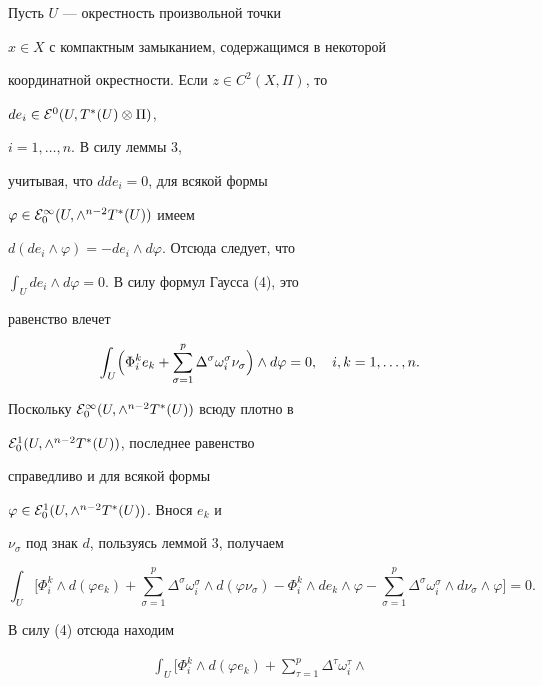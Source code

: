 \begin{pf} Пусть $U$ --- окрестность произвольной точки


$x\in X$ с компактным замыканием, содержащимся в некоторой


координатной окрестности. Если $z\in C^2(X,\Pi)$, то


$de_i\in {\cal E}^0(U,T^*(U)\otimes \Pi)$,


$i= 1,\dotsc,n$. В силу леммы 3,


учитывая, что $dde_i= 0$, для всякой формы


$\varphi\in {\cal E}^{\infty}_0(U,\wedge^{n-2}T^*(U))$ имеем


$d(de_i\wedge \varphi)= -de_i\wedge d\varphi$. Отсюда следует, что


$\int_U de_i\wedge d\varphi= 0$. В силу формул Гаусса (4), это


равенство влечет


$$


\int_{U}\Bigl(\Phi^k_ie_k+\sum_{\sigma=1}^{p}\Delta^{\sigma}\omega^{\sigma}_i


\nu_{\sigma}\Bigr)\wedge d\varphi=0,\quad i,k=1,\dotsc,n.


$$


Поскольку ${\cal E}^{\infty}_0(U,\wedge^{n-2}T^*(U))$ всюду плотно в


${\cal E}^1_0(U,\wedge^{n-2}T^*(U))$, последнее равенство


справедливо и для всякой формы


$\varphi\in {\cal E}^1_0(U,\wedge^{n-2}T^*(U))$. Внося $e_k$ и


$\nu_{\sigma}$ под знак $d$, пользуясь леммой 3, получаем


$$


\int_{U}\biggl[\Phi^k_i\wedge d(\varphi e_k)+


\sum_{\sigma=1}^{p}\Delta^{\sigma}\omega^{\sigma}_i\wedge


d(\varphi\nu_{\sigma})-\Phi^k_i\wedge de_k\wedge\varphi-


\sum_{\sigma=1}^{p}\Delta^{\sigma}\omega^{\sigma}_i\wedge


d\nu_{\sigma}\wedge\varphi\biggr]=0.


$$


В силу (4) отсюда находим


\begin{gather*}


\int_{U}\biggl[\Phi^k_i\wedge d(\varphi e_k)+


\sum_{\tau=1}^{p}\Delta^{\tau}\omega^{\tau}_i\wedge



\end{gather*}
\end{pf}

